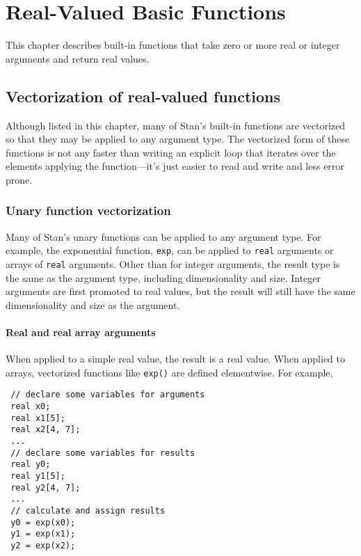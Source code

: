 \documentclass[
  10pt,
]{book}
\begin{document}
\hypertarget{real-valued-basic-functions}{%
\chapter{Real-Valued Basic Functions}\label{real-valued-basic-functions}}

This chapter describes built-in functions that take zero or more real
or integer arguments and return real values.

\hypertarget{fun-vectorization}{%
\section{Vectorization of real-valued functions}\label{fun-vectorization}}

Although listed in this chapter, many of Stan's built-in functions are
vectorized so that they may be applied to any argument type. The
vectorized form of these functions is not any faster than writing an
explicit loop that iterates over the elements applying the
function---it's just easier to read and write and less error prone.

\hypertarget{unary-function-vectorization}{%
\subsection{Unary function vectorization}\label{unary-function-vectorization}}

Many of Stan's unary functions can be applied to any argument type.
For example, the exponential function, \texttt{exp}, can be applied to \texttt{real}
arguments or arrays of \texttt{real} arguments. Other than for integer
arguments, the result type is the same as the argument type, including
dimensionality and size. Integer arguments are first promoted to real
values, but the result will still have the same dimensionality and
size as the argument.

\hypertarget{real-and-real-array-arguments}{%
\subsubsection{Real and real array arguments}\label{real-and-real-array-arguments}}

When applied to a simple real value, the result is a real value. When
applied to arrays, vectorized functions like \texttt{exp()} are defined
elementwise. For example,

\begin{verbatim}
 // declare some variables for arguments
 real x0;
 real x1[5];
 real x2[4, 7];
 ...
 // declare some variables for results
 real y0;
 real y1[5];
 real y2[4, 7];
 ...
 // calculate and assign results
 y0 = exp(x0);
 y1 = exp(x1);
 y2 = exp(x2);
\end{verbatim}
\end{document}
